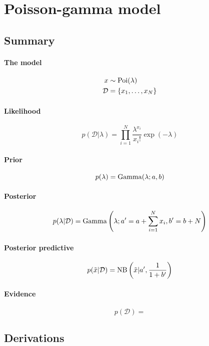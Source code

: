 \section{Poisson-gamma model}
\subsection{Summary}
\paragraph{The model}
    \begin{align}
        x           &\sim \operatorname{Poi}(\lambda) \\
        \mathcal D  &= \{x_1, \dotsc, x_N\}
    \end{align}

\paragraph{Likelihood}
    \begin{equation}
        p(\mathcal D | \lambda) = \prod_{i = 1}^N \frac{\lambda^{x_i}}{x_i!} \exp(-\lambda)
    \end{equation}

\paragraph{Prior}
    \begin{equation}
        p(\lambda) = \operatorname{Gamma}(\lambda; a, b)
    \end{equation}

\paragraph{Posterior}
    \begin{equation}
        p(\lambda | \mathcal D) = \operatorname{Gamma}\left(\lambda; a' = a + \sum_{i = 1}^N x_i, b' = b + N\right)
    \end{equation}

\paragraph{Posterior predictive}
    \begin{align}
        p(\tilde x | \mathcal D) = \operatorname{NB}\left(\tilde x | a', \frac{1}{1 + b'}\right)
    \end{align}

\paragraph{Evidence}
    \begin{equation}
        p(\mathcal D) = 
    \end{equation}

\subsection{Derivations}